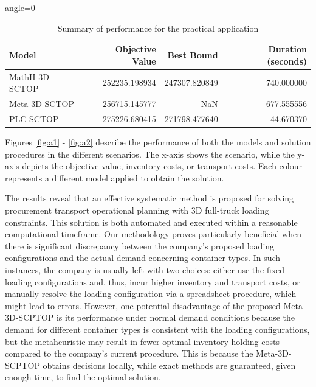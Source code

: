 \begin{table}[h!]
  \centering
  \caption{Summary of performance for the practical application}
  \label{tab:CaseStudySumary}
  \begin{adjustbox}{angle=0}
    \centering
    \begin{tabular}{lrrr}
      \toprule
      Model          & Objective Value & Best Bound    & Duration (seconds) \\
      \midrule
      MathH-3D-SCTOP & 252235.198934   & 247307.820849 & 740.000000         \\
      Meta-3D-SCTOP  & 256715.145777   & NaN           & 677.555556         \\
      PLC-SCTOP      & 275226.680415   & 271798.477640 & 44.670370          \\
      \bottomrule
    \end{tabular}
  \end{adjustbox}
\end{table}

Figures \ref{fig:a1} - \ref{fig:a2} describe the performance of both the models and solution procedures in the different scenarios. The x-axis shows the scenario, while the y-axis depicts the objective value, inventory costs, or transport costs. Each colour represents a different model applied to obtain the solution.


The results reveal that an effective systematic method is proposed for solving procurement transport operational planning with 3D full-truck loading constraints. This solution is both automated and executed within a reasonable computational timeframe. Our methodology proves particularly beneficial when there is significant discrepancy between the company’s proposed loading configurations and the actual demand concerning container types. In such instances, the company is usually left with two choices: either use the fixed loading configurations and, thus, incur higher inventory and transport costs, or manually resolve the loading configuration via a spreadsheet procedure, which might lead to errors. However, one potential disadvantage of the proposed Meta-3D-SCPTOP is its performance under normal demand conditions because the demand for different container types is consistent with the loading configurations, but the metaheuristic may result in fewer optimal inventory holding costs compared to the company’s current procedure. This is because the Meta-3D-SCPTOP obtains decisions locally, while exact methods are guaranteed, given enough time, to find the optimal solution.

